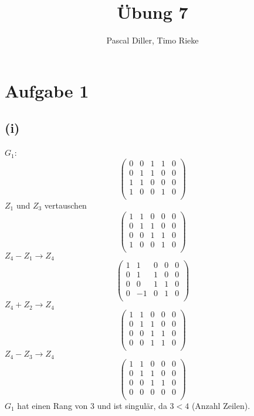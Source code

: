 \documentclass{article}
\title{Übung 7}
\author{Pascal Diller, Timo Rieke}
\begin{document}
\maketitle

\section{Aufgabe 1}
\subsection{(i)}
$G_1$:
\[\left(\begin{matrix}
    0 & 0 & 1 & 1 & 0 \\
    0 & 1 & 1 & 0 & 0 \\
    1 & 1 & 0 & 0 & 0 \\
    1 & 0 & 0 & 1 & 0 \\
\end{matrix}\right)\]
$Z_1$ und $Z_3$ vertauschen
\[\left(\begin{matrix}
    1 & 1 & 0 & 0 & 0 \\
    0 & 1 & 1 & 0 & 0 \\
    0 & 0 & 1 & 1 & 0 \\
    1 & 0 & 0 & 1 & 0 \\
\end{matrix}\right)\]
$Z_4 - Z_1 \to Z_4$
\[\left(\begin{matrix}
    1 & 1 & 0 & 0 & 0 \\
    0 & 1 & 1 & 0 & 0 \\
    0 & 0 & 1 & 1 & 0 \\
    0 & -1 & 0 & 1 & 0 \\
\end{matrix}\right)\]
$Z_4 + Z_2 \to Z_4$
\[\left(\begin{matrix}
    1 & 1 & 0 & 0 & 0 \\
    0 & 1 & 1 & 0 & 0 \\
    0 & 0 & 1 & 1 & 0 \\
    0 & 0 & 1 & 1 & 0 \\
\end{matrix}\right)\]
$Z_4 - Z_3 \to Z_4$
\[\left(\begin{matrix}
    1 & 1 & 0 & 0 & 0 \\
    0 & 1 & 1 & 0 & 0 \\
    0 & 0 & 1 & 1 & 0 \\
    0 & 0 & 0 & 0 & 0 \\
\end{matrix}\right)\]
$G_1$ hat einen Rang von 3 und ist singulär, da $3 < 4$ (Anzahl Zeilen). \\
\end{document}
